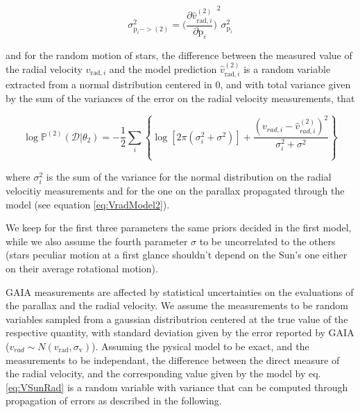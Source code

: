 \begin{equation}\label{eq:ParallaxErrorPropagation}
    \sigma^2_{\text{p}_i -> (2)} = {\biggl( \frac{\partial \hat{v}^{(2)}_{\text{rad}, i}}{\partial \text{p}_i} \biggr)}^2 \sigma^2_{\text{p}_i}
\end{equation}

and for the random motion of stars, the difference between the measured value of the radial velocity $v_{\text{rad}, i}$ and the model prediction $\hat{v}^{(2)}_{\text{rad}, i}$ is a random variable extracted from a normal distribution centered in 0, and with total variance given by the sum of the variances of the error on the radial velocity measurements, that 

\begin{equation}\label{Eq:LogLikeMod2}
    \log \mathbb{P}^{(2)}(\mathcal{D} \vert \theta_2) = -\frac{1}{2}\sum_i\left\{\log[2\pi(\sigma_{i}^2+\sigma^2)]+\frac{(v_{rad,i} - \hat{v}_{rad,i}^{(2)})^2}{\sigma_{i}^2+\sigma^2}\right\}
\end{equation}

\noindent where $\sigma_i^2$ is the sum of the variance for the normal distribution on the radial velocitiy measurements and for the one on the parallax propagated through the model (see equation \ref{eq:VradModel2}).

We keep for the first three parameters the same priors decided in the first model, while we also assume the fourth parameter $\sigma$ to be uncorrelated to the others (stars peculiar motion at a first glance shouldn't depend on the Sun's one either on their average rotational motion). 

GAIA measurements are affected by statistical uncertainties on the evaluations of the parallax and the radial velocity. We assume the measurements to be random variables sampled from a gaussian distributrion centered at the true value of the respective quantity, with standard deviation given by the error reported by GAIA ($v_{rad} \sim N(v_{\text{rad}},\sigma_{\text{v}})$). Assuming the pysical model to be exact, and the measurements to be independant, the difference between the direct measure of the radial velocity, and the corresponding value given by the model by eq.\ref{eq:VSunRad} is a random variable with variance that can be computed through propagation of errors as described in the following. 